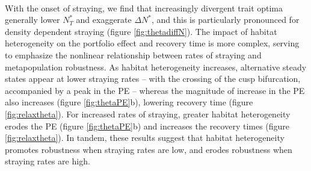 \documentclass{revtex4}
\begin{document}
\\ 
\noindent With the onset of straying, we find that increasingly divergent trait optima generally lower $N_T^*$ and exaggerate $\Delta N^*$, and this is particularly pronounced for density dependent straying (figure \ref{fig:thetadiffN}). %
The impact of habitat heterogeneity on the portfolio effect and recovery time is more complex, serving to emphasize the nonlinear relationship between rates of straying and metapopulation robustness. %
As habitat heterogeneity increases, alternative steady states appear at lower straying rates -- with the crossing of the cusp bifurcation, accompanied by a peak in the PE -- whereas the magnitude of increase in the PE also increases (figure \ref{fig:thetaPE}b), lowering recovery time (figure \ref{fig:relaxtheta}).
For increased rates of straying, greater habitat heterogeneity erodes the PE (figure \ref{fig:thetaPE}b) and increases the recovery times (figure \ref{fig:relaxtheta}).
In tandem, these results suggest that habitat heterogeneity promotes robustness when straying rates are low, and erodes robustness when straying rates are high.
\end{document}
